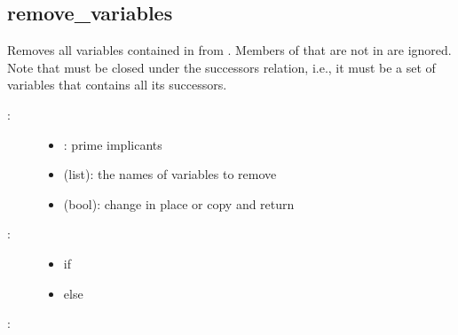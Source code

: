 \documentclass[letterpaper,10pt,english]{sphinxmanual}
\begin{document}
\subsection{remove\_variables}
\label{\detokenize{PrimeImplicants:remove-variables}}\label{\detokenize{PrimeImplicants:id13}}

\begin{fulllineitems}
\label{\detokenize{PrimeImplicants:PyBoolNet.PrimeImplicants.remove_variables}}
Removes all variables contained in  from .
Members of  that are not in  are ignored.
Note that  must be closed under the successors relation, i.e.,
it must be a set of variables that contains all its successors.
\begin{description}
\item[{:}] \leavevmode\begin{itemize}
\item {} 
: prime implicants

\item {} 
 (list): the names of variables to remove

\item {} 
 (bool): change  in place or copy and return

\end{itemize}

\item[{:}] \leavevmode\begin{itemize}
\item {} 
 if 

\item {} 
 else

\end{itemize}

\end{description}

:

\begin{sphinxVerbatim}[commandchars=\\\{\}]
  \PYG{p}{[}\PYG{p}{]}
 
\end{sphinxVerbatim}

\end{fulllineitems}
\end{document}

